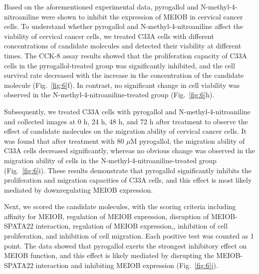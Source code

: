 \documentclass[unnumsec,webpdf,contemporary,large]{oup-authoring-template}%
\theoremstyle{thmstyleone}%
\theoremstyle{thmstyletwo}%
\theoremstyle{thmstylethree}%
\begin{document}
Based on the aforementioned experimental data, pyrogallol and N-methyl-4-nitroaniline were shown to inhibit the expression of MEIOB in cervical cancer cells. To understand whether pyrogallol and N-methyl-4-nitroaniline affect the viability of cervical cancer cells, we treated C33A cells with different concentrations of candidate molecules and detected their viability at different times. The CCK-8 assay results showed that the proliferation capacity of C33A cells in the pyrogallol-treated group was significantly inhibited, and the cell survival rate decreased with the increase in the concentration of the candidate molecule (Fig.~\ref{fig:6}f). In contrast, no significant change in cell viability was observed in the N-methyl-4-nitroaniline-treated group (Fig.~\ref{fig:6}h).

Subsequently, we treated C33A cells with pyrogallol and N-methyl-4-nitroaniline and collected images at 0 h, 24 h, 48 h, and 72 h after treatment to observe the effect of candidate molecules on the migration ability of cervical cancer cells. It was found that after treatment with 80 $\mu$M pyrogallol, the migration ability of C33A cells decreased significantly, whereas no obvious change was observed in the migration ability of cells in the N-methyl-4-nitroaniline-treated group (Fig.~\ref{fig:6}i). These results demonstrate that pyrogallol significantly inhibits the proliferation and migration capacities of C33A cells, and this effect is most likely mediated by downregulating MEIOB expression.

Next, we scored the candidate molecules, with the scoring criteria including affinity for MEIOB, regulation of MEIOB expression, disruption of MEIOB-SPATA22 interaction, regulation of MEIOB expression,, inhibition of cell proliferation, and inhibition of cell migration. Each positive test was counted as 1 point. The data showed that pyrogallol exerts the strongest inhibitory effect on MEIOB function, and this effect is likely mediated by disrupting the MEIOB-SPATA22 interaction and inhibiting MEIOB expression (Fig.~\ref{fig:6}j).

\end{document}
